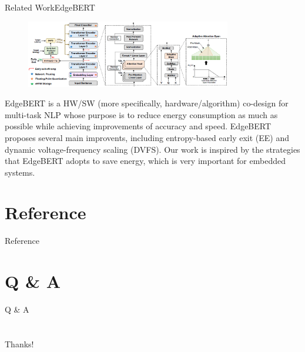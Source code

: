 \documentclass[12pt]{beamer}
\begin{document}
\begin{frame}{Related Work}{EdgeBERT}
\begin{figure}[H]
    \centering
    \includegraphics[width=0.8\textwidth]{EdgeBERT.png}
\end{figure}
\small EdgeBERT \cite{tambe2021edgebert} is a HW/SW (more specifically, hardware/algorithm) co-design for multi-task NLP whose purpose is to reduce energy consumption as much as possible while achieving improvements of accuracy and speed. EdgeBERT proposes several main improvents, including entropy-based early exit (EE) and dynamic voltage-frequency scaling (DVFS). Our work is inspired by the strategies that EdgeBERT adopts to save energy, which is very important for embedded systems.
\end{frame}

\section{Reference}
\begin{frame}{Reference}
    \printbibliography
\end{frame}

\section{Q \& A}
\begin{frame}
    \begin{center}
        Q \& A
    \end{center}
\end{frame}

\section{}
\begin{frame}
    \begin{center}
        Thanks!
    \end{center}
\end{frame}
\end{document}

